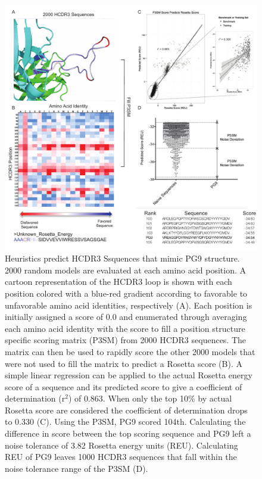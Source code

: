 \begin{figure}
   \centering
   \includegraphics[width=.9\linewidth]{images/chapter3/figure3_10.pdf} %
   \caption[Heuristics Predict HCDR3 Sequences that Mimic PG9 Structure]{Heuristics predict HCDR3 Ssquences that mimic PG9 structure. 2000 random models are evaluated at each amino acid position. A cartoon representation of the HCDR3 loop is shown with each position colored with a blue-red gradient according to favorable to unfavorable amino acid identities, respectively (A). Each position is initially assigned a score of 0.0 and enumerated through averaging each amino acid identity with the score to fill a position structure specific scoring matrix (P3SM) from 2000 HCDR3 sequences. The matrix can then be used to rapidly score the other 2000 models that were not used to fill the matrix to predict a Rosetta score (B). A simple linear regression can be applied to the actual Rosetta energy score of a sequence and its predicted score to give a coefficient of determination (r$^{2}$) of 0.863. When only the top 10\% by actual Rosetta score are considered the coefficient of determination drops to 0.330 (C). Using the P3SM, PG9 scored 104th. Calculating the difference in score between the top scoring sequence and PG9 left a noise tolerance of 3.82 Rosetta energy units (REU). Calculating  REU of PG9 leaves 1000 HCDR3 sequences that fall within the noise tolerance range of the P3SM (D).}
   \label{fig:figure3_10}
\end{figure}



